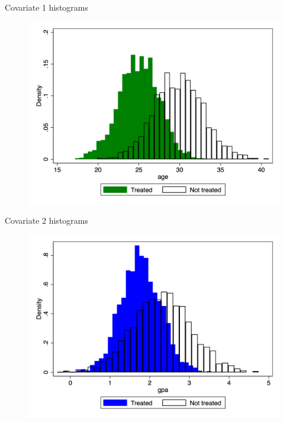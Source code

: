 \documentclass{beamer}
\begin{document}
\begin{frame}{Covariate 1  histograms}

  \begin{figure}
    \includegraphics[scale=0.25]{./lecture_includes/age_histogram}
  \end{figure}
  
\end{frame}

\begin{frame}{Covariate 2  histograms}

  \begin{figure}
    \includegraphics[scale=0.25]{./lecture_includes/gpa_histogram}
  \end{figure}
  
\end{frame}
\end{document}
